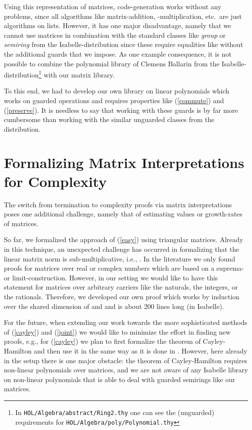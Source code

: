 \documentclass[a4paper]{llncs}
\newcommand{\rSub}[1]{(\ref{#1})}
\begin{document}
Using this representation of matrices, code-generation works without any
problems, since all algorithms like matrix-addition, -multiplication, etc.\ are
just algorithms on lists.
However, it has one major disadvantage, namely that we cannot use matrices
in combination with the standard
classes like \emph{group} or \emph{semiring} from the Isabelle-distribution since
these require equalities like  without the additional guards
that we impose. As one example consequence, it is not possible to combine the polynomial library of Clemens Ballarin
from the Isabelle-distribution\footnote{In
\texttt{HOL/Algebra/abstract/Ring2.thy} one can see the (unguarded) requirements for \texttt{HOL/Algebra/poly/Polynomial.thy}} with our matrix library.

To this end, we had to develop our own library on linear polynomials
which works on guarded operations and requires properties like \rSub{commute}
and \rSub{preserve}. It is needless to say that working with these guards
is by far more cumbersome than working with the similar unguarded classes 
from the distribution. 



\section{Formalizing Matrix Interpretations for Complexity}
\label{complexity}

The switch from termination to complexity proofs via matrix interpretations
poses one additional challenge, namely that of estimating values or
growth-rates of matrices. 

So far, we formalized the approach of \rSub{easy}
using triangular matrices. 
Already in this technique, an unexpected challenge has occurred in formalizing that 
the linear matrix norm is sub-multiplicative, i.e., . In the literature we only found proofs for matrices
over real or
complex numbers which are based on a suprema- or limit-construction. However, in our setting
we would like to have this statement for matrices over arbitrary carriers
like the
naturals, the integers, or the rationals. Therefore, we developed our own proof
which works by induction over the shared dimension of  and  and is about
200 lines long (in Isabelle).

For the future, when extending our work towards the more sophisticated methods
of \rSub{cayley} and \rSub{joint} we would like to minimize the effort in finding
new proofs, e.g., for \rSub{cayley} we plan to first formalize the theorem
of Cayley-Hamilton and then use it in the same way as it is done in \cite{NZM10}.
 However, here already in the setup there is one major obstacle:
the theorem of Cayley-Hamilton requires non-linear polynomials over
  matrices, and we are not aware of any Isabelle library on 
  non-linear polynomials
  that is able to deal with guarded semirings like our matrices.
  
\end{document}
